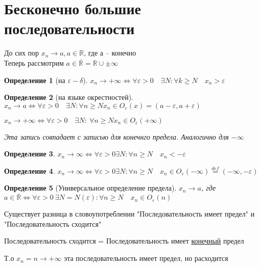 \documentclass{book}
\newtheorem{Def}{Определение}[chapter]
\begin{document}
\section{Бесконечно большие последовательности}

До сих пор $x_n \rightarrow a, a \in \mathds{R}$, где а -- конечно\\
Теперь рассмотрим $a \in \overline{\mathds{R}}= \mathds{R}\cup {\pm \infty}$

\begin{Def}[на $\varepsilon-\delta$]
	$x_n \rightarrow + \infty \Leftrightarrow \forall \varepsilon >0 \quad \exists N: \forall k \geqslant N\quad  x_n > \varepsilon$
\end{Def}

\begin{Def}[на языке окрестностей]
	$x_n \rightarrow a \Leftrightarrow \forall \varepsilon >0 \quad \exists N : \forall n\geqslant N x_n \in O_{\varepsilon}(x) = (a-\varepsilon, a+\varepsilon)$
	
	$x_n \rightarrow + \infty \Leftrightarrow \forall \varepsilon >0 \quad \exists N:~\forall n \geqslant N x_n \in O_{\varepsilon}(+\infty)$
	
	Эта запись совпадает с записью для конечнго предела. Аналогично для $-\infty$	
\end{Def}
\begin{Def}
	$x_n \rightarrow \infty \Leftrightarrow \forall \varepsilon >0 \exists N: \forall n \geqslant N\quad x_n < -\varepsilon$
\end{Def}

\begin{Def}
	$x_n \rightarrow \infty \Leftrightarrow \forall \varepsilon >0 \exists N: \forall n \geqslant N\quad x_n \in O_{\varepsilon}(-\infty)\overset{def}{=}(-\infty, -\varepsilon)$
\end{Def}

\begin{Def}[Универсальное определение предела]
	$x_n \rightarrow a$, где $a \in \overline{\mathds{R}}\Leftrightarrow \forall \varepsilon >0 ~ \exists N = N(\varepsilon): \forall n \geqslant N \quad x_n \in O_{\varepsilon}(n)$
\end{Def}

Существует разница в словоупотреблении "Последовательность имеет предел" и "Последовательность сходится"

Последовательность сходится = Последовательность имеет \underline{конечный} предел

Т.о $x_n = n \rightarrow + \infty$ эта последовательность имеет предел, но расходится
\end{document}
